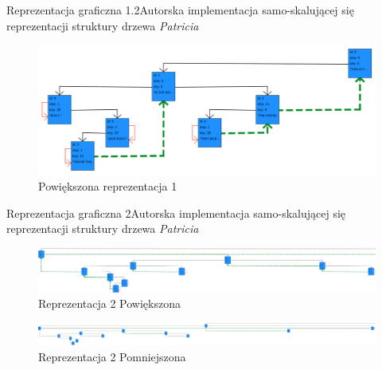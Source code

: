 \documentclass[aspectratio=1610,english]{beamer} %
\begin{document}
	\begin{frame}{Reprezentacja graficzna 1.2}{Autorska implementacja samo-skalującej się reprezentacji struktury drzewa \emph{Patricia}}
        \begin{figure}[H]
	        \fontsize{3}{5} \selectfont
	        \caption{Powiększona reprezentacja 1}\label{fig:PowiekszonaVisRepresentation}
	        \hspace*{-0.9cm}\includegraphics[width=1.1\textwidth]{visaulRepresentation1.png}
	    \end{figure}
    \end{frame}
	\begin{frame}{Reprezentacja graficzna 2}{Autorska implementacja samo-skalującej się reprezentacji struktury drzewa \emph{Patricia}}
        \begin{figure}[H]
	        \fontsize{3}{5} \selectfont
	        \caption{Reprezentacja 2 Powiększona}\label{fig:ZoomInVisRepresentation2}
	        \hspace*{-0.75cm}\includegraphics[width=1.1\textwidth]{representationBigger-zoomedIn_compressed.png}
	    \end{figure}
        \begin{figure}[H]
	        \fontsize{3}{5} \selectfont
	        \caption{Reprezentacja 2 Pomniejszona}\label{fig:ZoomOutVisRepresentation1}
	        \hspace*{-0.75cm}\includegraphics[width=1.1\textwidth]{representationBigger-zoomedOut_compressed.png}
	    \end{figure}
    \end{frame}
\end{document}
